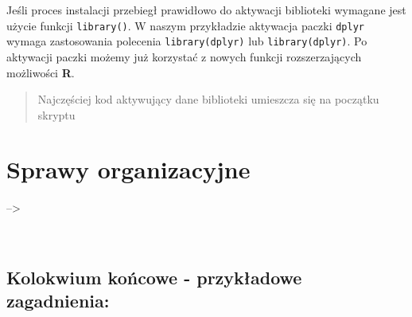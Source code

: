 \documentclass[]{book}
\theoremstyle{definition}
\theoremstyle{definition}
\theoremstyle{definition}
\theoremstyle{remark}
\begin{document}
Jeśli proces instalacji przebiegł prawidłowo do aktywacji biblioteki
wymagane jest użycie funkcji \texttt{library()}. W naszym przykładzie
aktywacja paczki \texttt{dplyr} wymaga zastosowania polecenia
\texttt{library(dplyr)} lub
\texttt{library(\textquotesingle{}dplyr\textquotesingle{})}. Po
aktywacji paczki możemy już korzystać z nowych funkcji rozszerzających
możliwości \textbf{R}.

\begin{quote}
Najczęściej kod aktywujący dane biblioteki umieszcza się na początku
skryptu
\end{quote}

\chapter*{Sprawy organizacyjne}\label{sprawy-organizacyjne}

--\textgreater{}

~

\section*{Kolokwium końcowe - przykładowe
zagadnienia:}\label{kolokwium-koncowe---przykadowe-zagadnienia}
\end{document}
